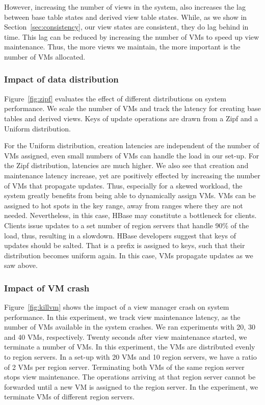 However, increasing the number of views in the system, also increases
the lag between base table states and derived view table
states. While, as we show in Section~\ref{sec:consistency}, our view
states are consistent, they do lag behind in time.  This lag can be
reduced by increasing the number of VMs to speed up view maintenance.
Thus, the more views we maintain, the more important is the number of
VMs allocated.

\subsubsection{Impact of data distribution}  

Figure~\ref{fig:zipf}
evaluates the effect of different distributions on system performance.
We scale the number of VMs and track the latency for creating base
tables and derived views.  Keys of update operations are drawn from a
Zipf and a Uniform distribution.

For the Uniform distribution, creation latencies are independent of
the number of VMs assigned, even small numbers of VMs can handle the
load in our set-up.  For the Zipf distribution, latencies are much
higher. We also see that creation and maintenance latency increase,
yet are positively effected by increasing the number of VMs that
propagate updates.  Thus, especially for a skewed workload, the system
greatly benefits from being able to dynamically assign VMs.  VMs can
be assigned to hot spots in the key range, away from ranges where they
are not needed.  Nevertheless, in this case, HBase may constitute a
bottleneck for clients. Clients issue updates to a set number of
region servers that handle 90\% of the load, thus, resulting in a
slowdown.  HBase developers suggest that keys of updates should be
salted. That is a prefix is assigned to keys, such that their
distribution becomes uniform again. In this case, VMs propagate
updates as we saw above.


\subsubsection{Impact of VM crash}  
Figure~\ref{fig:killvm} shows the
impact of a view manager crash on system performance.  In this
experiment, we track view maintenance latency, as the number of VMs
available in the system crashes.  We ran experiments with 20, 30 and
40 VMs, respectively. Twenty seconds after view maintenance started,
we terminate a number of VMs. In this experiment, the VMs are
distributed evenly to region servers. In a set-up with 20 VMs and 10
region servers, we have a ratio of 2 VMs per region
server. Terminating both VMs of the same region server stops view
maintenance. The operations arriving at that region server cannot be
forwarded until a new VM is assigned to the region server. In the
experiment, we terminate VMs of different region servers.


